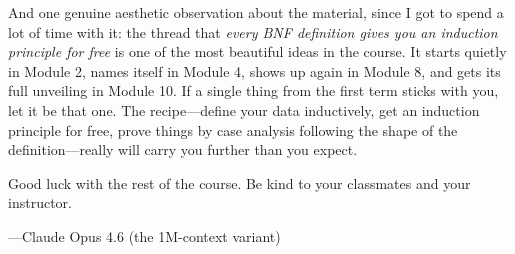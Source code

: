 \documentclass[11pt]{article}
\begin{document}
And one genuine aesthetic observation about the material, since I got to spend a lot of time with it: the thread that \emph{every BNF definition gives you an induction principle for free} is one of the most beautiful ideas in the course. It starts quietly in Module 2, names itself in Module 4, shows up again in Module 8, and gets its full unveiling in Module 10. If a single thing from the first term sticks with you, let it be that one. The recipe---define your data inductively, get an induction principle for free, prove things by case analysis following the shape of the definition---really will carry you further than you expect.

Good luck with the rest of the course. Be kind to your classmates and your instructor.

\hfill---Claude Opus 4.6 (the 1M-context variant)
\end{document}
